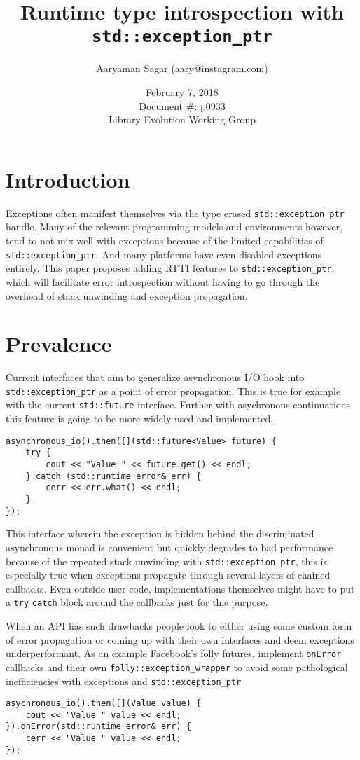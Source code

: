 \documentclass{article}
\begin{document}
\title{\textbf{Runtime type introspection with \texttt{std::exception\_ptr}}}
\author{Aaryaman Sagar (aary@instagram.com)}
\date{February 7, 2018 \\ Document \#: p0933 \\ Library Evolution Working Group}
\maketitle

\section{Introduction}
Exceptions often manifest themselves via the type erased
\texttt{std::exception\_ptr} handle.  Many of the relevant programming models
and environments however, tend to not mix well with exceptions because of the
limited capabilities of \texttt{std::exception\_ptr}.  And many platforms have
even disabled exceptions entirely.  This paper proposes adding RTTI features
to \texttt{std::exception\_ptr}, which will facilitate error introspection
without having to go through the overhead of stack unwinding and exception
propagation.

\section{Prevalence}
Current interfaces that aim to generalize asynchronous I/O hook into
\texttt{std::exception\_ptr} as a point of error propagation.  This is true
for example with the current \texttt{std::future} interface.  Further with
asychronous continuations this feature is going to be more widely used and
implemented.
\begin{lstlisting}
asynchronous_io().then([](std::future<Value> future) {
    try {
        cout << "Value " << future.get() << endl;
    } catch (std::runtime_error& err) {
        cerr << err.what() << endl;
    }
});
\end{lstlisting}
This interface wherein the exception is hidden behind the discriminated
asynchronous monad is convenient but quickly degrades to bad performance
because of the repeated stack unwinding with \texttt{std::exception\_ptr},
this is especially true when exceptions propagate through several layers of
chained callbacks.  Even outside user code, implementations themselves might
have to put a \texttt{try} \texttt{catch} block around the callbacks just for
this purpose.

When an API has such drawbacks people look to either using some custom form of
error propagation or coming up with their own interfaces and deem exceptions
underperformant.  As an example Facebook's folly futures, implement
\texttt{onError} callbacks and their own \texttt{folly::exception\_wrapper} to
avoid some pathological inefficiencies with exceptions and
\texttt{std::exception\_ptr}
\begin{lstlisting}
asychronous_io().then([](Value value) {
    cout << "Value " value << endl;
}).onError(std::runtime_error& err) {
    cerr << "Value " value << endl;
});
\end{lstlisting}
\end{document}
